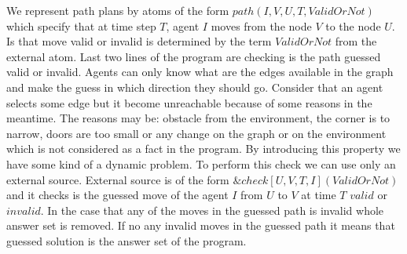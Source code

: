 \documentclass[14pt,a4paper, titlepage]{article}
\newcommand{\ext}[3]{\ensuremath{\&{#1}[#2](#3)}}
\begin{document}
We represent path plans by atoms of the form 
$\mathit{path(I, V, U, T, ValidOrNot)}$ which specify that 
at time step $T$, agent $I$ moves from the node $V$ to the 
node $U$. Is that move valid or invalid is determined by 
the term $\mathit{ValidOrNot}$ from the external atom. Last 
two lines of the program are checking is the path guessed 
valid or invalid. Agents can only know what are the edges 
available in the graph and make the guess in which 
direction they should go. Consider that an agent selects 
some 
edge but it become unreachable because of some reasons in the meantime. 
The reasons may be: obstacle from the environment, the 
corner is to narrow, doors are too small or any change on 
the graph or on the environment which is not considered as 
a fact in the program. By introducing this property we have 
some kind of a dynamic problem. To perform this check we 
can use only an external source. External source is of the 
form \ext{check}{U,V,T,I}{ValidOrNot} and it checks is the 
guessed move of the agent $I$ from $U$ to $V$ at time $T$ 
$\mathit{valid}$ or $\mathit{invalid}$. In the case that 
any of the moves in the guessed path is invalid whole 
answer set is removed. If no 
any invalid moves in the guessed path it means that guessed 
solution is the answer set of the program.            
\end{document}
